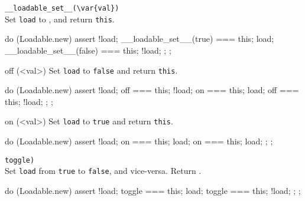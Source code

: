 \begin{urbiscriptapi}
\item \lstinline|__loadable_set__(\var{val})|\\
  Set \lstinline|load| to , and return \lstinline|this|.
\begin{urbiassert}
do (Loadable.new)
{
  assert
  {
    !load;
    __loadable_set__(true) === this;
    load;
    __loadable_set__(false) === this;
    !load;
  };
};
\end{urbiassert}

\item[off](<val>)%
  Set \lstinline|load| to \lstinline|false| and return
  \lstinline|this|.
\begin{urbiassert}
do (Loadable.new)
{
  assert
  {
    !load;
    off === this;
    !load;
    on === this;
    load;
    off === this;
    !load;
  };
};
\end{urbiassert}

\item[on](<val>)%
  Set \lstinline|load| to \lstinline|true| and return \lstinline|this|.
\begin{urbiassert}
do (Loadable.new)
{
  assert
  {
    !load;
    on === this;
    load;
    on === this;
    load;
  };
};
\end{urbiassert}

\item \lstinline|toggle)|\\
  Set \lstinline|load| from \lstinline|true| to \lstinline|false|, and
  vice-versa.  Return .
\begin{urbiassert}
do (Loadable.new)
{
  assert
  {
    !load;
    toggle === this;
    load;
    toggle === this;
    !load;
  };
};
\end{urbiassert}
\end{urbiscriptapi}

